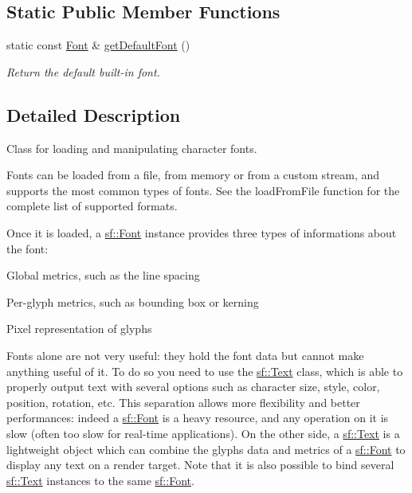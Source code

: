 \subsection*{Static Public Member Functions}
\begin{DoxyCompactItemize}
\item 
static const \hyperlink{classsf_1_1_font}{Font} \& \hyperlink{classsf_1_1_font_a88fc3372800948a1f8655c533cb8a952}{get\-Default\-Font} ()
\begin{DoxyCompactList}\small\item\em Return the default built-\/in font. \end{DoxyCompactList}\end{DoxyCompactItemize}


\subsection{Detailed Description}
Class for loading and manipulating character fonts. 

Fonts can be loaded from a file, from memory or from a custom stream, and supports the most common types of fonts. See the load\-From\-File function for the complete list of supported formats.

Once it is loaded, a \hyperlink{classsf_1_1_font}{sf\-::\-Font} instance provides three types of informations about the font\-: \begin{DoxyItemize}
\item Global metrics, such as the line spacing \item Per-\/glyph metrics, such as bounding box or kerning \item Pixel representation of glyphs\end{DoxyItemize}
Fonts alone are not very useful\-: they hold the font data but cannot make anything useful of it. To do so you need to use the \hyperlink{classsf_1_1_text}{sf\-::\-Text} class, which is able to properly output text with several options such as character size, style, color, position, rotation, etc. This separation allows more flexibility and better performances\-: indeed a \hyperlink{classsf_1_1_font}{sf\-::\-Font} is a heavy resource, and any operation on it is slow (often too slow for real-\/time applications). On the other side, a \hyperlink{classsf_1_1_text}{sf\-::\-Text} is a lightweight object which can combine the glyphs data and metrics of a \hyperlink{classsf_1_1_font}{sf\-::\-Font} to display any text on a render target. Note that it is also possible to bind several \hyperlink{classsf_1_1_text}{sf\-::\-Text} instances to the same \hyperlink{classsf_1_1_font}{sf\-::\-Font}.

